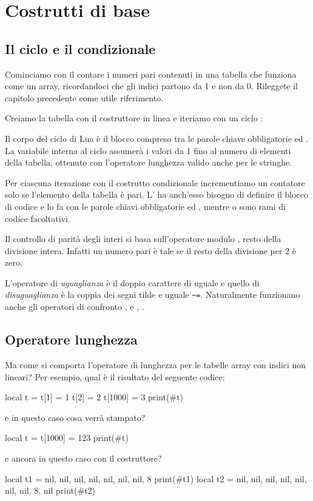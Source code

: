 

\chapter{Costrutti di base}

\section{Il ciclo  e il condizionale }
\label{iiSecCicloIf}

Cominciamo con il contare i numeri pari contenuti in una tabella che funziona
come un array, ricordandoci che gli indici partono da 1 e non da 0. Rileggete
il capitolo precedente come utile riferimento.

Creiamo la tabella con il costruttore in linea e iteriamo con un ciclo
:

Il corpo del ciclo  di Lua è il blocco compreso tra le parole
chiave obbligatorie  ed . La variabile  interna
al ciclo assumerà i valori da 1 fino al numero di elementi della tabella,
ottenuto con l'operatore lunghezza \key{\#} valido anche per le stringhe.

Per ciascuna iterazione con il costrutto condizionale 
incrementiamo un contatore solo se l'elemento della tabella è pari. L'
ha anch'esso bisogno di definire il blocco di codice e lo fa con le parole
chiavi obbligatorie  ed , mentre
 o  sono rami di codice
facoltativi.

Il controllo di parità degli interi si basa sull'operatore modulo
\key{\%}\luas{\%}, resto della divisione intera. Infatti un numero pari è tale
se il resto della divisione per 2 è zero. 

L'operatore di \emph{uguaglianza} è il doppio carattere di uguale
\key{==}\luas{==} e quello di \emph{disuguaglianza} è la coppia dei segni tilde
e uguale \verb|~=|\luas{~=}. Naturalmente funzionano anche gli operatori di
confronto \key{>}\luas{>}, \key{>=}\luas{>=} e \key{<}\luas{<},
\key{<=}\luas{<=}.


\section{Operatore lunghezza}
\label{iiSecLenOperator}

Ma come si comporta l'operatore di lunghezza \key{\#}\luas{\#} per le
tabelle array con indici non lineari? Per esempio, qual è il risultato del
seguente codice:
\begin{lines}
local t = {}
t[1] = 1
t[2] = 2
t[1000] = 3
print(#t)
\end{lines}
e in questo caso cosa verrà stampato?
\begin{lines}
local t = {}
t[1000] = 123
print(#t)
\end{lines}
e ancora in questo caso con il costruttore?
\begin{lines}
local t1 = {nil, nil,  nil, nil, nil, nil, nil, 8}
print(#t1)
local t2 = {nil, nil,  nil, nil, nil, nil, nil, 8, nil}
print(#t2)
\end{lines}


